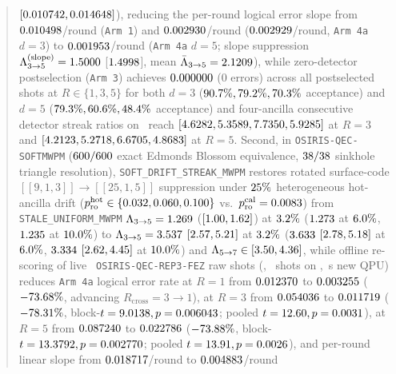 \documentclass[aps,prx,twocolumn,superscriptaddress,nofootinbib]{revtex4-2}
\begin{document}
\begin{abstract}
$[\rfsRepFiveBlkDThreeRFiveA, \rfsRepFiveBlkDThreeRFiveB]$), reducing the per-round logical error slope from $\rfsRepFiveSlopeArmOne$/round (\texttt{Arm 1}) and $\rfsRepFiveSlopeArmFourDThreeRounded$/round ($\rfsRepFiveSlopeArmFourDThree$/round, \texttt{Arm 4a} $d=3$) to $\rfsRepFiveSlopeArmFourDFive$/round (\texttt{Arm 4a} $d=5$; slope suppression $\Lambda_{3\to 5}^{(\mathrm{slope})} = \rfsRepFiveSlopeRatioRounded$ [$\rfsRepFiveSlopeRatio$], mean $\bar{\Lambda}_{3\to 5} = \rfsRepFiveMeanLam$), while zero-detector postselection (\texttt{Arm 3}) achieves $\rfsRepFiveArmThreePostselZero$ ($0$ errors) across all postselected shots at $R \in \{1, 3, 5\}$ for both $d=3$ ($\rfsRepFiveAccDThreeROnePct, \rfsRepFiveAccDThreeRThreePct, \rfsRepFiveAccDThreeRFivePct$ acceptance) and $d=5$ ($\rfsRepFiveAccDFiveROnePct, \rfsRepFiveAccDFiveRThreePct, \rfsRepFiveAccDFiveRFivePct$ acceptance) and four-ancilla consecutive detector streak ratios on \rfsRepFiveAncChain\ reach $[\rfsRepFiveStreakRThreeA, \rfsRepFiveStreakRThreeB, \rfsRepFiveStreakRThreeC, \rfsRepFiveStreakRThreeD]$ at $R=3$ and $[\rfsRepFiveStreakRFiveA, \rfsRepFiveStreakRFiveB, \rfsRepFiveStreakRFiveC, \rfsRepFiveStreakRFiveD]$ at $R=5$. Second, in \texttt{OSIRIS-QEC-SOFTMWPM} ($\rfsSoftBlossomSyndromes/\rfsSoftBlossomSyndromes$ exact Edmonds Blossom equivalence, $\rfsSoftSinkholeTriangles/\rfsSoftSinkholeTriangles$ sinkhole triangle resolution), \texttt{SOFT\_DRIFT\_STREAK\_MWPM} restores rotated surface-code $[[9,1,3]] \to [[25,1,5]]$ suppression under $\rfsSoftHotFracPct$ heterogeneous hot-ancilla drift ($p_{\mathrm{ro}}^{\mathrm{hot}} \in \{\rfsSoftPRoHotA, \rfsSoftPRoHotB, \rfsSoftPRoHotC\}$ vs.\ $p_{\mathrm{ro}}^{\mathrm{cal}} = \rfsSoftPRoCal$) from \texttt{STALE\_UNIFORM\_MWPM} $\Lambda_{3\to 5} = \rfsSoftSurfStaleLamA$ ($[\rfsSoftSurfStaleLamACiLo, \rfsSoftSurfStaleLamACiHi]$) at $\rfsSoftPRoHotAPct$ ($\rfsSoftSurfStaleLamB$ at $\rfsSoftPRoHotBPct$, $\rfsSoftSurfStaleLamC$ at $\rfsSoftPRoHotCPct$) to $\Lambda_{3\to 5} = \rfsSoftSurfSoftLamA$ $[\rfsSoftSurfSoftLamACiLo, \rfsSoftSurfSoftLamACiHi]$ at $\rfsSoftPRoHotAPct$ ($\rfsSoftSurfSoftLamB$ $[\rfsSoftSurfSoftLamBCiLo, \rfsSoftSurfSoftLamBCiHi]$ at $\rfsSoftPRoHotBPct$, $\rfsSoftSurfSoftLamC$ $[\rfsSoftSurfSoftLamCCiLo, \rfsSoftSurfSoftLamCCiHi]$ at $\rfsSoftPRoHotCPct$) and $\Lambda_{5\to 7} \in [\rfsSoftSurfSoftLamFiveSevenMin, \rfsSoftSurfSoftLamFiveSevenMax]$, while offline re-scoring of live \rfsBackend\ \texttt{OSIRIS-QEC-REP3-FEZ} raw shots (\rfsSoftFezRepThreeJobId, \rfsSoftFezTotalShots\ shots on \rfsSoftFezChain, \rfsSimQpuSec\,s new QPU) reduces \texttt{Arm 4a} logical error rate at $R=1$ from $\rfsSoftFezROneUnif$ to $\rfsSoftFezROneSoft$ ($-\rfsSoftFezROneRedPct$, advancing $R_{\mathrm{cross}} = 3 \to 1$), at $R=3$ from $\rfsSoftFezRThreeUnif$ to $\rfsSoftFezRThreeSoft$ ($-\rfsSoftFezRThreeRedPct$, block-$t=\rfsSoftFezRThreeBlockT, p=\rfsSoftFezRThreeBlockP$; pooled $t=\rfsSoftFezRThreePooledT, p=\rfsSoftFezRThreePooledP$), at $R=5$ from $\rfsSoftFezRFiveUnif$ to $\rfsSoftFezRFiveSoft$ ($-\rfsSoftFezRFiveRedPct$, block-$t=\rfsSoftFezRFiveBlockT, p=\rfsSoftFezRFiveBlockP$; pooled $t=\rfsSoftFezRFivePooledT, p=\rfsSoftFezRFivePooledP$), and per-round linear slope from $\rfsSoftFezSlopeUnif$/round to $\rfsSoftFezSlopeSoft$/round 
\end{abstract}
\end{document}
